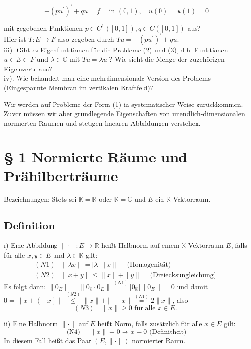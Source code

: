 \documentclass[10pt, letterpaper]{article}
\begin{document}
$$
-\left(p u^{\prime}\right)^{\prime}+q u=f \quad \text { in }(0,1), \quad u(0)=u(1)=0
$$

mit gegebenen Funktionen $p \in C^{1}([0,1]), q \in C([0,1])$ aus?\\
Hier ist $T: E \rightarrow F$ also gegeben durch $T u=-\left(p u^{\prime}\right)^{\prime}+q u$.\\
iii). Gibt es Eigenfunktionen für die Probleme (2) und (3), d.h. Funktionen $u \in E \subset F$ und $\lambda \in \mathbb{C}$ mit $T u=\lambda u$ ? Wie sieht die Menge der zugehörigen Eigenwerte aus?\\
iv). Wie behandelt man eine mehrdimensionale Version des Problems (Eingespannte Membran im vertikalen Kraftfeld)?

Wir werden auf Probleme der Form (1) in systematischer Weise zurückkommen. Zuvor müssen wir aber grundlegende Eigenschaften von unendlich-dimensionalen normierten Räumen und stetigen linearen Abbildungen verstehen.



\pagebreak


\section*{§ 1 Normierte Räume und Prähilberträume}
Bezeichnungen: Stets sei $\mathbb{K}=\mathbb{R}$ oder $\mathbb{K}=\mathbb{C}$ und $E$ ein $\mathbb{K}$-Vektorraum.


\subsection*{Definition}
i) Eine Abbildung $\|\cdot\|: E \rightarrow \mathbb{R}$ heißt Halbnorm auf einem $\mathbb{K}$-Vektorraum $E$, falls für alle $x, y \in E$ und $\lambda \in \mathbb{K}$ gilt:
$$
\begin{array}{ll}
(N 1) & \|\lambda x\|=|\lambda|\|x\| \quad \text { (Homogenität) } \\
(N 2) & \|x+y\| \leq\|x\|+\|y\| \quad \text { (Dreiecksungleichung) }
\end{array}
$$
Es folgt dann: $\left\|0_{E}\right\|=\left\|0_{\mathbb{K}} \cdot 0_{E}\right\| \stackrel{(N 1)}{=}\left|0_{\mathbb{K}}\right|\left\|0_{E}\right\|=0$ und damit $0=\|x+(-x)\| \stackrel{(N 2)}{\leq} \|x\|+\|-x\| \stackrel{(N 1)}{=} 2\|x\|$, also
$$
(N 3) \quad\|x\| \geq 0 \text { für alle } x \in E \text {. }
$$

ii) Eine Halbnorm $\|\cdot\|$ auf $E$ heißt Norm, falls zusätzlich für alle $x \in E$ gilt:
$$
\text { (N4) } \quad\|x\|=0 \Rightarrow x=0 \text { (Definitheit) }
$$
In diesem Fall heißt das Paar $(E,\|\cdot\|)$ normierter Raum.
\end{document}
